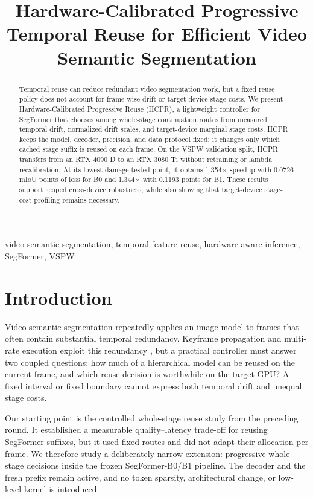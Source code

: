 \documentclass{article}
\title{Hardware-Calibrated Progressive Temporal Reuse for Efficient Video Semantic Segmentation}
\begin{document}
\ninept
\maketitle

\begin{abstract}
Temporal reuse can reduce redundant video segmentation work, but a fixed reuse policy does not account for frame-wise drift or target-device stage costs. We present Hardware-Calibrated Progressive Reuse (HCPR), a lightweight controller for SegFormer that chooses among whole-stage continuation routes from measured temporal drift, normalized drift scales, and target-device marginal stage costs. HCPR keeps the model, decoder, precision, and data protocol fixed; it changes only which cached stage suffix is reused on each frame. On the VSPW validation split, HCPR transfers from an RTX 4090 D to an RTX 3080 Ti without retraining or lambda recalibration. At its lowest-damage tested point, it obtains 1.354$\times$ speedup with 0.0726 mIoU points of loss for B0 and 1.344$\times$ with 0.1193 points for B1. These results support scoped cross-device robustness, while also showing that target-device stage-cost profiling remains necessary.
\end{abstract}

\begin{keywords}
video semantic segmentation, temporal feature reuse, hardware-aware inference, SegFormer, VSPW
\end{keywords}

\section{Introduction}
Video semantic segmentation repeatedly applies an image model to frames that often contain substantial temporal redundancy. Keyframe propagation and multi-rate execution exploit this redundancy \cite{zhu2017dff,shelhamer2016clockwork,jain2019accel}, but a practical controller must answer two coupled questions: how much of a hierarchical model can be reused on the current frame, and which reuse decision is worthwhile on the target GPU? A fixed interval or fixed boundary cannot express both temporal drift and unequal stage costs.

Our starting point is the controlled whole-stage reuse study from the preceding round. It established a measurable quality--latency trade-off for reusing SegFormer suffixes, but it used fixed routes and did not adapt their allocation per frame. We therefore study a deliberately narrow extension: progressive whole-stage decisions inside the frozen SegFormer-B0/B1 pipeline. The decoder and the fresh prefix remain active, and no token sparsity, architectural change, or low-level kernel is introduced.
\end{document}
